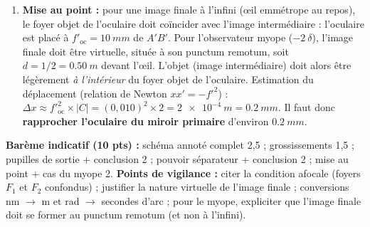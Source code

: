 \documentclass[11pt]{article}
\begin{document}
\begin{corrige}
\begin{enumerate}
    \item \textbf{Mise au point :} pour une image finale à l'infini (œil emmétrope au repos), le foyer objet de l'oculaire doit coïncider avec l'image intermédiaire : l'oculaire est placé à $f'_{\text{oc}} = \SI{10}{mm}$ de $A'B'$. Pour l'observateur myope ($-2\ \delta$), l'image finale doit être virtuelle, située à son punctum remotum, soit $d = 1/2 = \SI{0,50}{m}$ devant l'œil. L'objet (image intermédiaire) doit alors être légèrement \emph{à l'intérieur} du foyer objet de l'oculaire. Estimation du déplacement (relation de Newton $x x' = -f'^2$) : $\Delta x \approx f'^2_{\text{oc}} \times |C| = (0,010)^2 \times 2 = \SI{2e-4}{m} = \SI{0,2}{mm}$. Il faut donc \textbf{rapprocher l'oculaire du miroir primaire} d'environ $\SI{0,2}{mm}$.
\end{enumerate}
\textbf{Barème indicatif (10 pts) :} schéma annoté complet 2,5 ; grossissements 1,5 ; pupilles de sortie + conclusion 2 ; pouvoir séparateur + conclusion 2 ; mise au point + cas du myope 2.
\textbf{Points de vigilance :} citer la condition afocale (foyers $F_1$ et $F_2$ confondus) ; justifier la nature virtuelle de l'image finale ; conversions nm $\rightarrow$ m et rad $\rightarrow$ secondes d'arc ; pour le myope, expliciter que l'image finale doit se former au punctum remotum (et non à l'infini).
\end{corrige}
\end{document}
